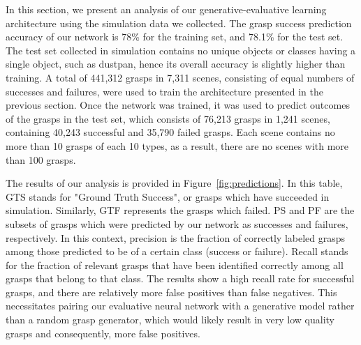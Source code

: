 In this section, we present an analysis of our generative-evaluative learning architecture using the simulation data we collected. The grasp success prediction accuracy of our network is 78\% for the training set, and 78.1\% for the test set. The test set collected in simulation contains no unique objects or classes having a single object, such as dustpan, hence its overall accuracy is slightly higher than training. A total of 441,312 grasps in 7,311 scenes, consisting of equal numbers of successes and failures, were used to train the architecture presented in the previous section. Once the network was trained, it was used to predict outcomes of the grasps in the test set, which consists of 76,213 grasps in 1,241 scenes, containing 40,243 successful and 35,790 failed grasps. Each scene contains no more than 10 grasps of each 10 types, as a result, there are no scenes with more than 100 grasps. 

The results of our analysis is provided in Figure~\ref{fig:predictions}. In this table, GTS stands for "Ground Truth Success", or grasps which have succeeded in simulation. Similarly, GTF represents the grasps which failed. PS and PF are the subsets of grasps which were predicted by our network as successes and failures, respectively. In this context, precision is the fraction of correctly labeled grasps among those predicted to be of a certain class (success or failure). Recall stands for the fraction of relevant grasps that have been identified correctly among all grasps that belong to that class. The results show a high recall rate for successful grasps, and there are relatively more false positives than false negatives. This necessitates pairing our evaluative neural network with a generative model rather than a random grasp generator, which would likely result in very low quality grasps and consequently, more false positives. 


